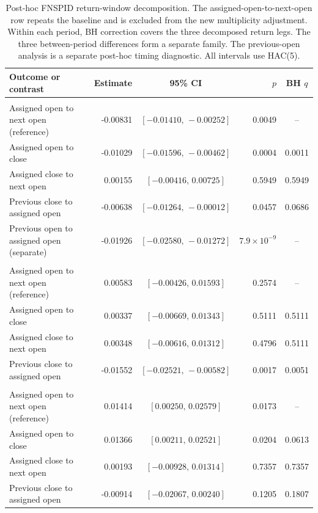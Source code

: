 \begin{table}[htbp]
\centering
\caption[Outcome-leg decomposition]{Post-hoc FNSPID return-window decomposition. The assigned-open-to-next-open row repeats the baseline and is excluded from the new multiplicity adjustment. Within each period, BH correction covers the three decomposed return legs. The three between-period differences form a separate family. The previous-open analysis is a separate post-hoc timing diagnostic. All intervals use HAC(5).}
\label{tab:outcome-leg-decomposition}
\scriptsize
\begin{tabular}{@{}>{\raggedright\arraybackslash}p{5.5cm} d{-1.5} c d{1.4} c@{}}
\toprule
Outcome or contrast & {Estimate} & {95\% CI} & {$p$} & {BH $q$} \\
\midrule
{} \\
\quad Assigned open to next open (reference) & -0.00831 & $[-0.01410,\,-0.00252]$ & 0.0049 & -- \\
\quad Assigned open to close & -0.01029 & $[-0.01596,\,-0.00462]$ & 0.0004 & 0.0011 \\
\quad Assigned close to next open & 0.00155 & $[-0.00416,\,0.00725]$ & 0.5949 & 0.5949 \\
\quad Previous close to assigned open & -0.00638 & $[-0.01264,\,-0.00012]$ & 0.0457 & 0.0686 \\
\quad Previous open to assigned open (separate) & -0.01926 & $[-0.02580,\,-0.01272]$ &  & -- \\
\addlinespace
{} \\
\quad Assigned open to next open (reference) & 0.00583 & $[-0.00426,\,0.01593]$ & 0.2574 & -- \\
\quad Assigned open to close & 0.00337 & $[-0.00669,\,0.01343]$ & 0.5111 & 0.5111 \\
\quad Assigned close to next open & 0.00348 & $[-0.00616,\,0.01312]$ & 0.4796 & 0.5111 \\
\quad Previous close to assigned open & -0.01552 & $[-0.02521,\,-0.00582]$ & 0.0017 & 0.0051 \\
\addlinespace
{} \\
\quad Assigned open to next open (reference) & 0.01414 & $[0.00250,\,0.02579]$ & 0.0173 & -- \\
\quad Assigned open to close & 0.01366 & $[0.00211,\,0.02521]$ & 0.0204 & 0.0613 \\
\quad Assigned close to next open & 0.00193 & $[-0.00928,\,0.01314]$ & 0.7357 & 0.7357 \\
\quad Previous close to assigned open & -0.00914 & $[-0.02067,\,0.00240]$ & 0.1205 & 0.1807 \\
\bottomrule
\end{tabular}
\end{table}
